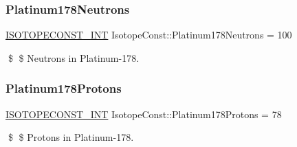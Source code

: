 \subsubsection{\texorpdfstring{Platinum178\+Neutrons}{Platinum178Neutrons}}
{\footnotesize\ttfamily \mbox{\hyperlink{group___isotope_const-_macros_ga5f18360b3e99483a35c32d789e62621c}{I\+S\+O\+T\+O\+P\+E\+C\+O\+N\+S\+T\+\_\+\+I\+NT}} Isotope\+Const\+::\+Platinum178\+Neutrons = 100}

\$ \$ Neutrons in Platinum-\/178. \mbox{\label{group___isotope_const-_platinum-_pt178_ga134c83e84da16d8a48e9ab30a94db80c}} 
\subsubsection{\texorpdfstring{Platinum178\+Protons}{Platinum178Protons}}
{\footnotesize\ttfamily \mbox{\hyperlink{group___isotope_const-_macros_ga5f18360b3e99483a35c32d789e62621c}{I\+S\+O\+T\+O\+P\+E\+C\+O\+N\+S\+T\+\_\+\+I\+NT}} Isotope\+Const\+::\+Platinum178\+Protons = 78}

\$ \$ Protons in Platinum-\/178. 